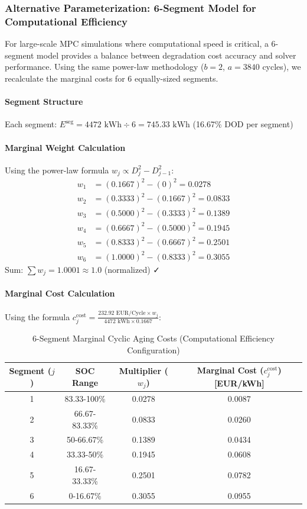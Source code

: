 \documentclass[11pt, a4paper]{article}
\begin{document}
\subsubsection{Alternative Parameterization: 6-Segment Model for Computational Efficiency}
For large-scale MPC simulations where computational speed is critical, a 6-segment model provides a balance between degradation cost accuracy and solver performance. Using the same power-law methodology ($b=2$, $a=3840$ cycles), we recalculate the marginal costs for 6 equally-sized segments.

\paragraph{Segment Structure}
Each segment: $E^{\mathrm{seg}} = 4472 \text{ kWh} \div 6 = 745.33 \text{ kWh}$ (16.67\% DOD per segment)

\paragraph{Marginal Weight Calculation}
Using the power-law formula $w_j \propto D_j^2 - D_{j-1}^2$:
\begin{align*}
w_1 &= (0.1667)^2 - (0)^2 = 0.0278 \\
w_2 &= (0.3333)^2 - (0.1667)^2 = 0.0833 \\
w_3 &= (0.5000)^2 - (0.3333)^2 = 0.1389 \\
w_4 &= (0.6667)^2 - (0.5000)^2 = 0.1945 \\
w_5 &= (0.8333)^2 - (0.6667)^2 = 0.2501 \\
w_6 &= (1.0000)^2 - (0.8333)^2 = 0.3055
\end{align*}
Sum: $\sum w_j = 1.0001 \approx 1.0$ (normalized) ✓

\paragraph{Marginal Cost Calculation}
Using the formula $c^{\mathrm{cost}}_{j} = \frac{232.92 \text{ EUR/Cycle} \times w_j}{4472 \text{ kWh} \times 0.1667}$:

\begin{table}[h!]
\centering
\caption{6-Segment Marginal Cyclic Aging Costs (Computational Efficiency Configuration)}
\label{tab:marginal_costs_6seg}
\begin{tabular}{@{}cccc@{}}
\toprule
\textbf{Segment ($j$)} & \textbf{SOC Range} & \textbf{Multiplier ($w_j$)} & \textbf{Marginal Cost ($c^{\mathrm{cost}}_{j}$) [EUR/kWh]} \\ \midrule
1 & 83.33-100\% & 0.0278 & 0.0087 \\
2 & 66.67-83.33\% & 0.0833 & 0.0260 \\
3 & 50-66.67\% & 0.1389 & 0.0434 \\
4 & 33.33-50\% & 0.1945 & 0.0608 \\
5 & 16.67-33.33\% & 0.2501 & 0.0782 \\
6 & 0-16.67\% & 0.3055 & 0.0955 \\ \bottomrule
\end{tabular}
\end{table}
\end{document}
